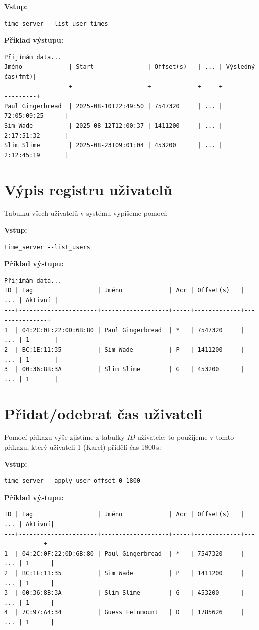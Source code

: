 \documentclass[11pt,a4paper]{book}
\begin{document}
\textbf{Vstup:}
\begin{verbatim}
time_server --list_user_times
\end{verbatim}

\textbf{Příklad výstupu:}
\begin{verbatim}
Přijímám data...
Jméno             | Start               | Offset(s)   | ... | Výsledný čas(fmt)|
------------------+---------------------+-------------+-----+------------------+
Paul Gingerbread  | 2025-08-10T22:49:50 | 7547320     | ... | 72:05:09:25      |
Sim Wade          | 2025-08-12T12:00:37 | 1411200     | ... | 2:17:51:32       |
Slim Slime        | 2025-08-23T09:01:04 | 453200      | ... | 2:12:45:19       |
\end{verbatim}

\newpage
\section{Výpis registru uživatelů}
Tabulku všech uživatelů v systému vypíšeme pomocí:

\textbf{Vstup:}
\begin{verbatim}
time_server --list_users
\end{verbatim}

\textbf{Příklad výstupu:}
\begin{verbatim}
Přijímám data...
ID | Tag                  | Jméno             | Acr | Offset(s)   | ... | Aktivní |
---+----------------------+-------------------+-----+-------------+---------------+
1  | 04:2C:0F:22:0D:6B:80 | Paul Gingerbread  | *   | 7547320     | ... | 1       |
2  | BC:1E:11:35          | Sim Wade          | P   | 1411200     | ... | 1       |
3  | 00:36:8B:3A          | Slim Slime        | G   | 453200      | ... | 1       |
\end{verbatim}

\section{Přidat/odebrat čas uživateli}
Pomocí příkazu výše zjistíme z tabulky \emph{ID} uživatele; to použijeme v tomto příkazu, který uživateli 1 (Karel) přidělí čas 1800\,s:

\textbf{Vstup:}
\begin{verbatim}
time_server --apply_user_offset 0 1800
\end{verbatim}

\textbf{Příklad výstupu:}
\begin{verbatim}
ID | Tag                  | Jméno             | Acr | Offset(s)   | ... | Aktivní|
---+----------------------+-------------------+-----+-------------+--------------+
1  | 04:2C:0F:22:0D:6B:80 | Paul Gingerbread  | *   | 7547320     | ... | 1      |
2  | BC:1E:11:35          | Sim Wade          | P   | 1411200     | ... | 1      |
3  | 00:36:8B:3A          | Slim Slime        | G   | 453200      | ... | 1      |
4  | 7C:97:A4:34          | Guess Feinmount   | D   | 1785626     | ... | 1      |
\end{verbatim}
\end{document}
